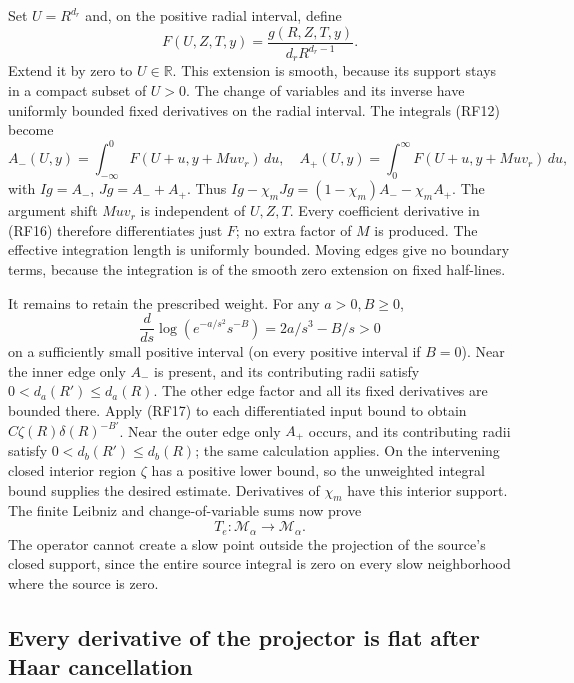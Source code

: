 \documentclass[10pt,a4paper]{article}
\begin{document}
Set \(U=R^{d_r}\) and, on the positive radial interval, define
\[
F(U,Z,T,y)=\frac{g(R,Z,T,y)}{d_rR^{d_r-1}}.
\]
Extend it by zero to \(U\in\mathbb R\). This extension is smooth,
because its support stays in a compact subset of \(U>0\). The
change of variables and its inverse have uniformly bounded fixed
derivatives on the radial interval. The integrals (RF12) become
\[
A_-(U,y)=\int_{-\infty}^0F(U+u,y+Muv_r)\,du,
\quad
A_+(U,y)=\int_0^\infty F(U+u,y+Muv_r)\,du,
\tag{RF16}
\]
with \(Ig=A_-\), \(Jg=A_-+A_+\). Thus
\(Ig-\chi_mJg=(1-\chi_m)A_--\chi_m A_+\).
The argument shift \(Muv_r\) is independent of \(U,Z,T\).
Every coefficient derivative in (RF16) therefore differentiates just
\(F\); no extra factor of \(M\) is produced. The effective
integration length is uniformly bounded. Moving edges give no boundary
terms, because the integration is of the smooth zero extension on fixed
half-lines.

It remains to retain the prescribed weight. For any \(a>0,B\ge0\),
\[
\frac d{ds}\log(e^{-a/s^2}s^{-B})=2a/s^3-B/s>0
\tag{RF17}
\]
on a sufficiently small positive interval (on every positive interval
if \(B=0\)). Near the inner edge only \(A_-\) is present, and
its contributing radii satisfy \(0<d_a(R')\le d_a(R)\).
The other edge factor and all its fixed derivatives are bounded there.
Apply (RF17) to each differentiated input bound to obtain
\(C\zeta(R)\delta(R)^{-B'}\). Near the outer edge only
\(A_+\) occurs, and its contributing radii satisfy
\(0<d_b(R')\le d_b(R)\); the same calculation applies.
On the intervening closed interior region \(\zeta\) has a positive
lower bound, so the unweighted integral bound supplies the desired
estimate. Derivatives of \(\chi_m\) have this interior support.
The finite Leibniz and change-of-variable sums now prove
\[
T_e:\mathcal M_\alpha\longrightarrow\mathcal M_\alpha.
\tag{RF18}
\]
The operator cannot create a slow point outside the projection of the
source's closed support, since the entire source integral is zero on
every slow neighborhood where the source is zero.

\subsection{Every derivative of the projector is flat after Haar cancellation}
\end{document}
